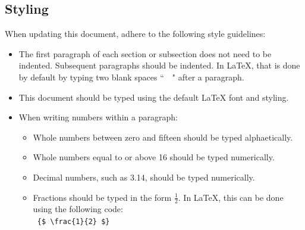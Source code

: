 \documentclass{scrreprt}
\begin{document}
\subsection{Styling}
When updating this document, adhere to the following style guidelines:
\begin{itemize}
    \item The first paragraph of each section or subsection does not need to be indented.
          Subsequent paragraphs should be indented.
          In LaTeX, that is done by default by typing two blank spaces ``\ \ " after a paragraph.
    \item This document should be typed using the default LaTeX font and styling.
    \item When writing numbers within a paragraph:
          \begin{itemize}
              \item Whole numbers between zero and fifteen should be typed alphaetically.
              \item Whole numbers equal to or above 16 should be typed numerically.
              \item Decimal numbers, such as 3.14, should be typed numerically.
              \item Fractions should be typed in the form {$\frac{1}{2}$}.
                    In LaTeX, this can be done using the following code:
                    \\ \texttt{ \{\$ \textbackslash frac\{1\}\{2\} \$\} }
          \end{itemize}
\end{itemize}
\end{document}
